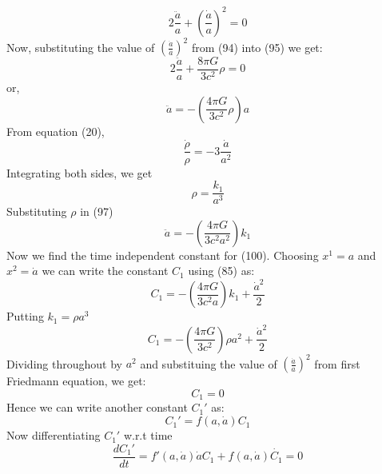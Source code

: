 \documentclass[14pt]{extarticle}
\begin{document}
\begin{equation}
2\frac{\ddot{a}}{a} + \left(\frac{\dot{a}}{a}\right)^{2} = 0
\end{equation}
Now, substituting the value of $\left(\frac{\dot{a}}{a}\right)^{2}$ from (94) into (95) we get:\\
\begin{equation}
2\frac{\ddot{a}}{a} + \frac{8 \pi G}{3 c^{2}} \rho=0
\end{equation}
or,\\
\begin{equation}
\ddot{a}= -\left(\frac{4 \pi G}{3 c^{2}} \rho\right) a
\end{equation}
From equation (20),\\
\begin{equation}
\frac{\dot{\rho}}{\rho} =-3 \frac{\dot{a}}{a^{2}}
\end{equation}
Integrating both sides, we get\\
\begin{equation}
\rho = \frac{k_{1}}{a^{3}}
\end{equation}
Substituting $\rho$ in (97)
\begin{equation}
\ddot{a}= -\left(\frac{4 \pi G}{3 c^{2} a^{2}} \right) k_{1}
\end{equation}
Now we find the time independent constant for (100). Choosing $x^{1}=a$ and $x^{2}=\dot{a}$ we can write the constant $C_{1}$ using (85) as:\\
\begin{equation}
C_{1}= -\left(\frac{4 \pi G}{3 c^{2} a} \right) k_{1} +\frac{\dot{a}^{2}}{2}
\end{equation}
Putting $k_{1}=\rho a^{3}$
\begin{equation}
C_{1}=-\left(\frac{4 \pi G}{3 c^{2} }\right) \rho a^{2} +\frac{\dot{a}^{2}}{2}
\end{equation}
Dividing throughout by $a^{2}$ and substituing the value of $\left(\frac{\dot{a}}{a}\right)^{2}$ from first Friedmann equation, we get:\\
\begin{equation}
C_{1}=0
\end{equation}
Hence we can write another constant $C_{1}'$ as:\\
\begin{equation}
C_{1}'= f(a,\dot{a}) C_{1}
\end{equation}
Now differentiating $C_{1}'$ w.r.t time
\begin{equation}
\frac{dC_{1}'}{dt}= f'(a,\dot{a})\dot{a}C_{1} + f(a,\dot{a})\dot{C_{1}}=0
\end{equation}
\end{document}
